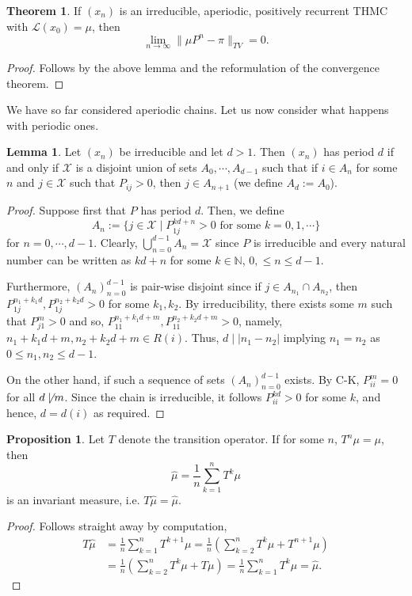 \documentclass[]{article}
\theoremstyle{definition}
\newtheorem{theorem}{Theorem}
\theoremstyle{definition}
\newtheorem{lemma}{Lemma}[section]
\newtheorem{proposition}{Proposition}[section]
\begin{document}
\begin{theorem}
  If \((x_n)\) is an irreducible, aperiodic, positively recurrent THMC with 
  \(\mathcal{L}(x_0) = \mu\), then
  \[\lim_{n \to \infty}\|\mu P^n - \pi\|_{TV} = 0.\]
\end{theorem}
\begin{proof}
  Follows by the above lemma and the reformulation of the convergence theorem.
\end{proof}

We have so far considered aperiodic chains. Let us now consider what happens 
with periodic ones.

\begin{lemma}
  Let \((x_n)\) be irreducible and let \(d > 1\). Then \((x_n)\) has period 
  \(d\) if and only if \(\mathcal{X}\) is a disjoint union of sets 
  \(A_0, \cdots, A_{d - 1}\) such that if \(i \in A_n\) for some \(n\) and 
  \(j \in \mathcal{X}\) such that \(P_{ij} > 0\), then \(j \in A_{n + 1}\) 
  (we define \(A_d := A_0\)).
\end{lemma}
\begin{proof}
  Suppose first that \(P\) has period \(d\). Then, we define 
  \[A_n := \{j \in \mathcal{X} \mid 
    P_{1j}^{kd + n} > 0 \text{ for some } k = 0, 1, \cdots\}\]
  for \(n = 0, \cdots, d - 1\). Clearly, \(\bigcup_{n = 0}^{d - 1} A_n = \mathcal{X}\)
  since \(P\) is irreducible and every natural number can be written as 
  \(kd + n\) for some \(k \in \mathbb{N}\), \(0, \le n \le d - 1\). 
  
  Furthermore, \((A_n)_{n = 0}^{d - 1}\) is pair-wise disjoint since if 
  \(j \in A_{n_1} \cap A_{n_2}\), then \(P_{1j}^{n_1 + k_1d}, P_{1j}^{n_2 + k_2d} > 0\)
  for some \(k_1, k_2\). By irreducibility, there exists some \(m\) such that 
  \(P_{j1}^m > 0\) and so, \(P_{11}^{n_1 + k_1d + m}, P_{11}^{n_2 + k_2d + m} > 0\), 
  namely, \(n_1 + k_1d + m, n_2 + k_2d + m \in R(i)\). Thus, \(d \mid |n_1 - n_2|\) 
  implying \(n_1 = n_2\) as \(0 \le n_1, n_2 \le d - 1\).

  On the other hand, if such a sequence of sets \((A_n)_{n = 0}^{d - 1}\) exists. 
  By C-K, \(P_{ii}^m = 0\) for all \(d \not \mid m\). Since the chain is irreducible, 
  it follows \(P^{kd}_{ii} > 0\) for some \(k\), and hence, \(d = d(i)\) as 
  required.
\end{proof}

\begin{proposition}
  Let \(T\) denote the transition operator. If for some \(n\), \(T^n \mu = \mu\), 
  then 
  \[\hat \mu = \frac{1}{n}\sum_{k = 1}^n T^k \mu\]
  is an invariant measure, i.e. \(T\hat\mu = \hat\mu\).
\end{proposition}
\begin{proof}
  Follows straight away by computation,
  \[\begin{split}
    T \hat\mu & = \frac{1}{n}\sum_{k = 1}^n T^{k + 1}\mu 
      = \frac{1}{n} \left(\sum_{k = 2}^n T^k \mu + T^{n + 1}\mu\right)\\
    & = \frac{1}{n} \left(\sum_{k = 2}^n T^k \mu + T\mu\right) 
      = \frac{1}{n}\sum_{k = 1}^n T^k \mu = \hat \mu.
  \end{split}\]
\end{proof}
\end{document}
